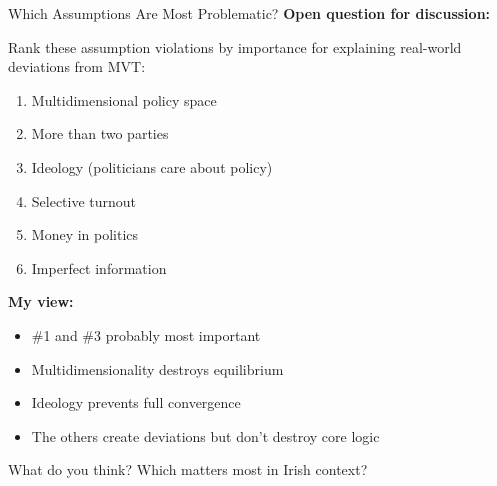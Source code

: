 \documentclass[10pt]{beamer}
\begin{document}
\begin{frame}[allowframebreaks]{Which Assumptions Are Most Problematic?}
\textbf{Open question for discussion:}


Rank these assumption violations by \alert{importance} for explaining real-world deviations from MVT:

\begin{enumerate}
\item Multidimensional policy space
\item More than two parties
\item Ideology (politicians care about policy)
\item Selective turnout
\item Money in politics
\item Imperfect information
\end{enumerate}

\framebreak

\textbf{My view:}
\begin{itemize}
\item \#1 and \#3 probably most important
\item Multidimensionality destroys equilibrium
\item Ideology prevents full convergence
\item The others create deviations but don't destroy core logic
\end{itemize}



What do you think? Which matters most in Irish context?
\end{frame}
\end{document}
